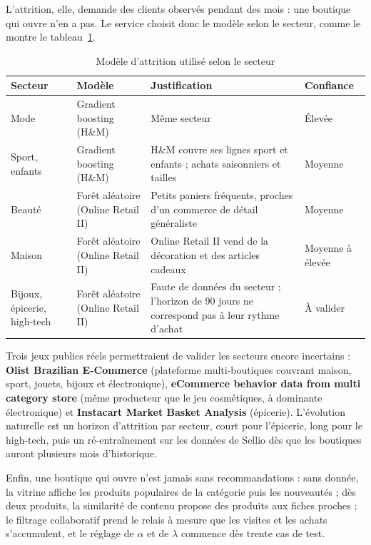 L'attrition, elle, demande des clients observés pendant des mois : une boutique qui ouvre n'en a pas. Le service choisit donc le modèle selon le secteur, comme le montre le tableau~\ref{tab:churn-secteur}.
\begin{table}[H]
\centering
\renewcommand{\arraystretch}{1.3}
\small
\begin{tabular}{|p{2.4cm}|p{3.2cm}|p{6.2cm}|p{2.6cm}|}
\hline
\textbf{Secteur} & \textbf{Modèle} & \textbf{Justification} & \textbf{Confiance} \\
\hline
Mode & Gradient boosting (H\&M) & Même secteur & Élevée \\
\hline
Sport, enfants & Gradient boosting (H\&M) & H\&M couvre ses lignes sport et enfants ; achats saisonniers et tailles & Moyenne \\
\hline
Beauté & Forêt aléatoire (Online Retail II) & Petits paniers fréquents, proches d'un commerce de détail généraliste & Moyenne \\
\hline
Maison & Forêt aléatoire (Online Retail II) & Online Retail II vend de la décoration et des articles cadeaux & Moyenne à élevée \\
\hline
Bijoux, épicerie, high-tech & Forêt aléatoire (Online Retail II) & Faute de données du secteur ; l'horizon de 90 jours ne correspond pas à leur rythme d'achat & À valider \\
\hline
\end{tabular}
\caption{Modèle d'attrition utilisé selon le secteur}
\label{tab:churn-secteur}
\end{table}

Trois jeux publics réels permettraient de valider les secteurs encore incertains : \textbf{Olist Brazilian E-Commerce} (plateforme multi-boutiques couvrant maison, sport, jouets, bijoux et électronique), \textbf{eCommerce behavior data from multi category store} (même producteur que le jeu cosmétiques, à dominante électronique) et \textbf{Instacart Market Basket Analysis} (épicerie). L'évolution naturelle est un horizon d'attrition par secteur, court pour l'épicerie, long pour le high-tech, puis un ré-entraînement sur les données de Sellio dès que les boutiques auront plusieurs mois d'historique.

Enfin, une boutique qui ouvre n'est jamais sans recommandations : sans donnée, la vitrine affiche les produits populaires de la catégorie puis les nouveautés ; dès deux produits, la similarité de contenu propose des produits aux fiches proches ; le filtrage collaboratif prend le relais à mesure que les visites et les achats s'accumulent, et le réglage de \(\alpha\) et de \(\lambda\) commence dès trente cas de test.

